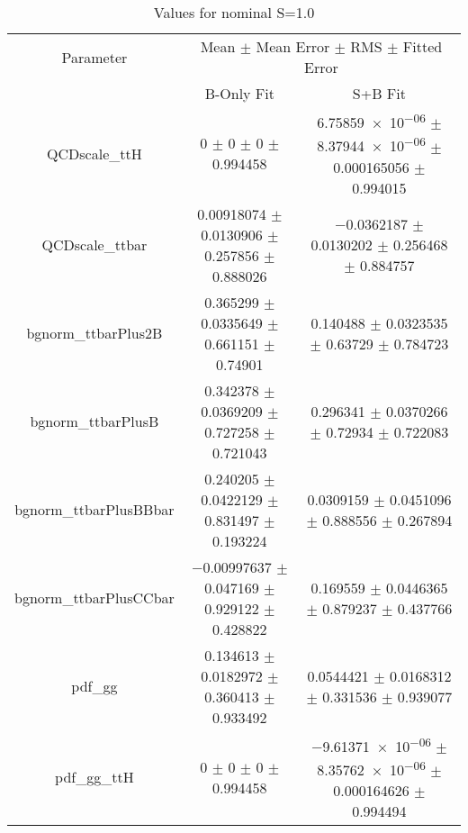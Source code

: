 \begin{table}
\centering
\caption{Values for nominal S=1.0}
\begin{tabular}{ccc}
\toprule
Parameter & \multicolumn{2}{c}{Mean $\pm$ Mean Error $\pm$ RMS $\pm$ Fitted Error}\\
 & B-Only Fit & S+B Fit\\
\midrule
QCDscale\_ttH & \num{0} $\pm$ \num{0} $\pm$ \num{0} $\pm$ \num{0.994458} & \num{6.75859e-06} $\pm$ \num{8.37944e-06} $\pm$ \num{0.000165056} $\pm$ \num{0.994015}\\
QCDscale\_ttbar & \num{0.00918074} $\pm$ \num{0.0130906} $\pm$ \num{0.257856} $\pm$ \num{0.888026} & \num{-0.0362187} $\pm$ \num{0.0130202} $\pm$ \num{0.256468} $\pm$ \num{0.884757}\\
bgnorm\_ttbarPlus2B & \num{0.365299} $\pm$ \num{0.0335649} $\pm$ \num{0.661151} $\pm$ \num{0.74901} & \num{0.140488} $\pm$ \num{0.0323535} $\pm$ \num{0.63729} $\pm$ \num{0.784723}\\
bgnorm\_ttbarPlusB & \num{0.342378} $\pm$ \num{0.0369209} $\pm$ \num{0.727258} $\pm$ \num{0.721043} & \num{0.296341} $\pm$ \num{0.0370266} $\pm$ \num{0.72934} $\pm$ \num{0.722083}\\
bgnorm\_ttbarPlusBBbar & \num{0.240205} $\pm$ \num{0.0422129} $\pm$ \num{0.831497} $\pm$ \num{0.193224} & \num{0.0309159} $\pm$ \num{0.0451096} $\pm$ \num{0.888556} $\pm$ \num{0.267894}\\
bgnorm\_ttbarPlusCCbar & \num{-0.00997637} $\pm$ \num{0.047169} $\pm$ \num{0.929122} $\pm$ \num{0.428822} & \num{0.169559} $\pm$ \num{0.0446365} $\pm$ \num{0.879237} $\pm$ \num{0.437766}\\
pdf\_gg & \num{0.134613} $\pm$ \num{0.0182972} $\pm$ \num{0.360413} $\pm$ \num{0.933492} & \num{0.0544421} $\pm$ \num{0.0168312} $\pm$ \num{0.331536} $\pm$ \num{0.939077}\\
pdf\_gg\_ttH & \num{0} $\pm$ \num{0} $\pm$ \num{0} $\pm$ \num{0.994458} & \num{-9.61371e-06} $\pm$ \num{8.35762e-06} $\pm$ \num{0.000164626} $\pm$ \num{0.994494}\\
\bottomrule
\end{tabular}
\end{table}